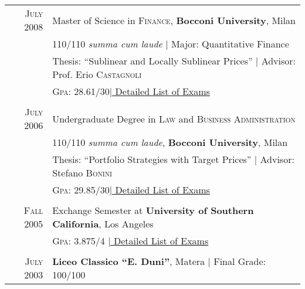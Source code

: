 \begin{tabular}{r|p{11cm}}	
 \textsc{July} 2008 & Master of Science in \textsc{Finance}, \textbf{Bocconi University}, Milan\\
& 110/110 \small\emph{summa cum laude} | Major: Quantitative Finance\\
& Thesis: ``Sublinear and Locally Sublinear Prices'' | \small Advisor: Prof. Erio \textsc{Castagnoli}\\
&\normalsize \textsc{Gpa}: 28.61/30\hyperlink{grds}{\hfill | \footnotesize Detailed List of Exams}\\&\\
\textsc{July} 2006& Undergraduate Degree in \textsc{Law} and \textsc{Business Administration} \\&110/110 \small\emph{summa cum laude}, \normalsize\textbf{Bocconi University}, Milan\\
& Thesis: ``Portfolio Strategies with Target Prices'' | \small Advisor: Stefano \textsc{Bonini}\\
&\normalsize \textsc{Gpa}: 29.85/30\hyperlink{grds_cleli}{\hfill| \footnotesize Detailed List of Exams}\\&\\
\textsc{Fall} 2005& Exchange Semester at \textbf{University of Southern California}, Los Angeles\\
&\textsc{Gpa}: 3.875/4 \hyperlink{grds_usc}{\hfill| \footnotesize Detailed List of Exams}\\&\\
\textsc{July} 2003& \textbf{Liceo Classico ``E. Duni''}, Matera | Final Grade: 100/100
\end{tabular}